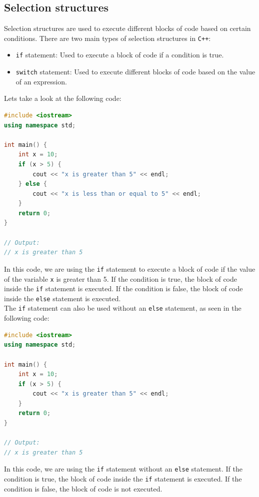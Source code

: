 \subsection{Selection structures}

Selection structures are used to execute different blocks of code based on certain conditions. There are two main
types of selection structures in \texttt{C++}:

\begin{itemize}
    \item \texttt{if} statement: Used to execute a block of code if a condition is true.
    \item \texttt{switch} statement: Used to execute different blocks of code based on the value of an expression.
\end{itemize}

Lets take a look at the following code:

\begin{lstlisting}[language=C++]
#include <iostream>
using namespace std;

int main() {
    int x = 10;
    if (x > 5) {
        cout << "x is greater than 5" << endl;
    } else {
        cout << "x is less than or equal to 5" << endl;
    }
    return 0;
}

// Output:
// x is greater than 5
\end{lstlisting}

In this code, we are using the \texttt{if} statement to execute a block of code if the value of the variable \texttt{x}
is greater than 5. If the condition is true, the block of code inside the \texttt{if} statement is executed. If the
condition is false, the block of code inside the \texttt{else} statement is executed.\\

The \texttt{if} statement can also be used without an \texttt{else} statement, as seen in the following code:

\begin{lstlisting}[language=C++]
#include <iostream>
using namespace std;

int main() {
    int x = 10;
    if (x > 5) {
        cout << "x is greater than 5" << endl;
    } 
    return 0;
}

// Output:
// x is greater than 5
\end{lstlisting}

In this code, we are using the \texttt{if} statement without an \texttt{else} statement. If the condition is true,
the block of code inside the \texttt{if} statement is executed. If the condition is false, the block of code is not
executed.\\

